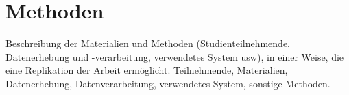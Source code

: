 \chapter{Methoden}\label{ch:2}

Beschreibung der Materialien und Methoden (Studienteilnehmende, Datenerhebung und -verarbeitung, verwendetes System \ac{usw}), in einer Weise, die eine Replikation der Arbeit ermöglicht. Teilnehmende, Materialien, Datenerhebung, Datenverarbeitung, verwendetes System, sonstige Methoden.
